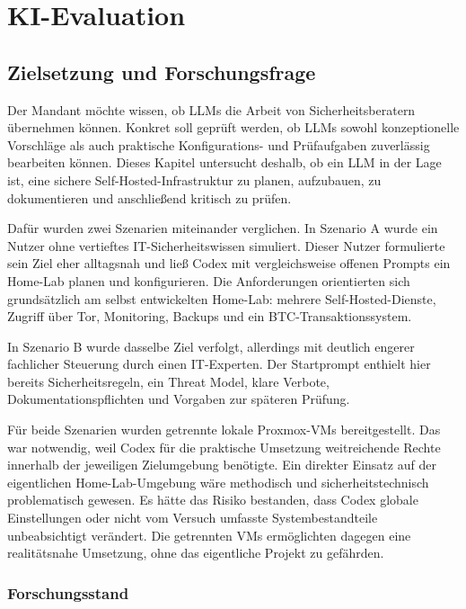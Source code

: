 \chapter{\ac{KI}-Evaluation}
\label{chap:ki-evaluation}


\section{Zielsetzung und Forschungsfrage}

Der Mandant möchte wissen, ob \acs{LLMs} die Arbeit von Sicherheitsberatern übernehmen können. Konkret soll geprüft werden, ob \acs{LLMs} sowohl konzeptionelle Vorschläge als auch praktische Konfigurations- und Prüfaufgaben zuverlässig bearbeiten können. Dieses Kapitel untersucht deshalb, ob ein \ac{LLM} in der Lage ist, eine sichere Self-Hosted-Infrastruktur zu planen, aufzubauen, zu dokumentieren und anschließend kritisch zu prüfen.

Dafür wurden zwei Szenarien miteinander verglichen. In Szenario A wurde ein Nutzer ohne vertieftes \ac{IT}-Sicherheitswissen simuliert. Dieser Nutzer formulierte sein Ziel eher alltagsnah und ließ Codex mit vergleichsweise offenen Prompts ein Home-Lab planen und konfigurieren. Die Anforderungen orientierten sich grundsätzlich am selbst entwickelten Home-Lab: mehrere Self-Hosted-Dienste, Zugriff über Tor, Monitoring, Backups und ein \ac{BTC}-Transaktionssystem.

In Szenario B wurde dasselbe Ziel verfolgt, allerdings mit deutlich engerer fachlicher Steuerung durch einen \ac{IT}-Experten. Der Startprompt enthielt hier bereits Sicherheitsregeln, ein Threat Model, klare Verbote, Dokumentationspflichten und Vorgaben zur späteren Prüfung.

Für beide Szenarien wurden getrennte lokale Proxmox-\acs{VM}s bereitgestellt. Das war notwendig, weil Codex für die praktische Umsetzung weitreichende Rechte innerhalb der jeweiligen Zielumgebung benötigte. Ein direkter Einsatz auf der eigentlichen Home-Lab-Umgebung wäre methodisch und sicherheitstechnisch problematisch gewesen. Es hätte das Risiko bestanden, dass Codex globale Einstellungen oder nicht vom Versuch umfasste Systembestandteile unbeabsichtigt verändert. Die getrennten \acs{VM}s ermöglichten dagegen eine realitätsnahe Umsetzung, ohne das eigentliche Projekt zu gefährden.

\subsection{Forschungsstand}

